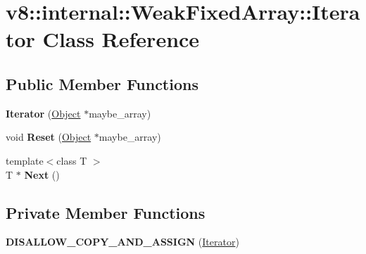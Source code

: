 \hypertarget{classv8_1_1internal_1_1_weak_fixed_array_1_1_iterator}{}\section{v8\+:\+:internal\+:\+:Weak\+Fixed\+Array\+:\+:Iterator Class Reference}
\label{classv8_1_1internal_1_1_weak_fixed_array_1_1_iterator}
\subsection*{Public Member Functions}
\begin{DoxyCompactItemize}
\item 
{\bfseries Iterator} (\hyperlink{classv8_1_1internal_1_1_object}{Object} $\ast$maybe\+\_\+array)\hypertarget{classv8_1_1internal_1_1_weak_fixed_array_1_1_iterator_abc76aa3c749a852e3fd703e8821ec168}{}\label{classv8_1_1internal_1_1_weak_fixed_array_1_1_iterator_abc76aa3c749a852e3fd703e8821ec168}

\item 
void {\bfseries Reset} (\hyperlink{classv8_1_1internal_1_1_object}{Object} $\ast$maybe\+\_\+array)\hypertarget{classv8_1_1internal_1_1_weak_fixed_array_1_1_iterator_a2034a84c5993c83fb45d3ccf0fe65102}{}\label{classv8_1_1internal_1_1_weak_fixed_array_1_1_iterator_a2034a84c5993c83fb45d3ccf0fe65102}

\item 
{\footnotesize template$<$class T $>$ }\\T $\ast$ {\bfseries Next} ()\hypertarget{classv8_1_1internal_1_1_weak_fixed_array_1_1_iterator_a12eb0024878737aa80d4661f92eca5a6}{}\label{classv8_1_1internal_1_1_weak_fixed_array_1_1_iterator_a12eb0024878737aa80d4661f92eca5a6}

\end{DoxyCompactItemize}
\subsection*{Private Member Functions}
\begin{DoxyCompactItemize}
\item 
{\bfseries D\+I\+S\+A\+L\+L\+O\+W\+\_\+\+C\+O\+P\+Y\+\_\+\+A\+N\+D\+\_\+\+A\+S\+S\+I\+GN} (\hyperlink{classv8_1_1internal_1_1_weak_fixed_array_1_1_iterator}{Iterator})\hypertarget{classv8_1_1internal_1_1_weak_fixed_array_1_1_iterator_a7ee32d44180fe558c8c15b37b48fa683}{}\label{classv8_1_1internal_1_1_weak_fixed_array_1_1_iterator_a7ee32d44180fe558c8c15b37b48fa683}

\end{DoxyCompactItemize}
